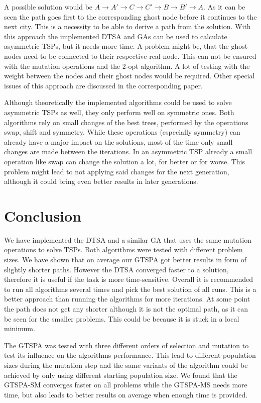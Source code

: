 \documentclass[12pt]{article}
\theoremstyle{plain}
\theoremstyle{definition}
\theoremstyle{remark}
\begin{document}
A possible solution would be $A \rightarrow A' \rightarrow C \rightarrow C' \rightarrow B \rightarrow B' \rightarrow A$.
As it can be seen the path goes first to the corresponding ghost node before it continues to the next city.
This is a necessity to be able to derive a path from the solution.
With this approach the implemented DTSA and GAs can be used to calculate asymmetric TSPs, but it needs more time.
A problem might be, that the ghost nodes need to be connected to their respective real node.
This can not be ensured with the mutation operations and the 2-opt algorithm.
A lot of testing with the weight between the nodes and their ghost nodes would be required.
Other special issues of this approach are discussed in the corresponding paper\cite{ATSP2}.

Although theoretically the implemented algorithms could be used to solve asymmetric TSPs as well, they only perform well on symmetric ones.
Both algorithms rely on small changes of the best trees, performed by the operations swap, shift and symmetry.
While these operations (especially symmetry) can already have a major impact on the solutions, most of the time only small changes are made between the iterations.
In an asymmetric TSP already a small operation like swap can change the solution a lot, for better or for worse.
This problem might lead to not applying said changes for the next generation, although it could bring even better results in later generations.


\section{Conclusion}
\label{sec:conclusion}

We have implemented the DTSA and a similar GA that uses the same mutation operations to solve TSPs.
Both algorithms were tested with different problem sizes.
We have shown that on average our GTSPA got better results in form of slightly shorter paths.
However the DTSA converged faster to a solution, therefore it is useful if the task is more time-sensitive.
Overall it is recommended to run all algorithms several times and pick the best solution of all runs.
This is a better approach than running the algorithms for more iterations.
At some point the path does not get any shorter although it is not the optimal path, as it can be seen for the smaller problems.
This could be because it is stuck in a local minimum.

The GTSPA was tested with three different orders of selection and mutation to test its influence on the algorithms performance.
This lead to different population sizes during the mutation step and the same variants of the algorithm could be achieved by only using different starting population size.
We found that the GTSPA-SM converges faster on all problems while the GTSPA-MS needs more time, but also leads to better results on average when enough time is provided.
\end{document}
